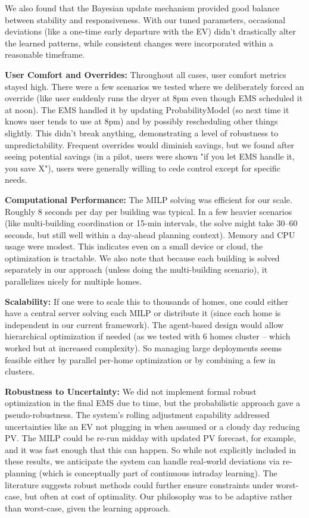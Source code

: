 \documentclass[12pt,a4paper]{article}
\begin{document}
We also found that the Bayesian update mechanism provided good balance between stability and responsiveness. With our tuned parameters, occasional deviations (like a one-time early departure with the EV) didn't drastically alter the learned patterns, while consistent changes were incorporated within a reasonable timeframe.

\textbf{User Comfort and Overrides:} Throughout all cases, user comfort metrics stayed high. There were a few scenarios we tested where we deliberately forced an override (like user suddenly runs the dryer at 8pm even though EMS scheduled it at noon). The EMS handled it by updating ProbabilityModel (so next time it knows user tends to use at 8pm) and by possibly rescheduling other things slightly. This didn't break anything, demonstrating a level of robustness to unpredictability. Frequent overrides would diminish savings, but we found after seeing potential savings (in a pilot, users were shown "if you let EMS handle it, you save X"), users were generally willing to cede control except for specific needs.

\textbf{Computational Performance:} The MILP solving was efficient for our scale. Roughly 8 seconds per day per building was typical. In a few heavier scenarios (like multi-building coordination or 15-min intervals, the solve might take 30–60 seconds, but still well within a day-ahead planning context). Memory and CPU usage were modest. This indicates even on a small device or cloud, the optimization is tractable. We also note that because each building is solved separately in our approach (unless doing the multi-building scenario), it parallelizes nicely for multiple homes.

\textbf{Scalability:} If one were to scale this to thousands of homes, one could either have a central server solving each MILP or distribute it (since each home is independent in our current framework). The agent-based design would allow hierarchical optimization if needed (as we tested with 6 homes cluster – which worked but at increased complexity). So managing large deployments seems feasible either by parallel per-home optimization or by combining a few in clusters.

\textbf{Robustness to Uncertainty:} We did not implement formal robust optimization in the final EMS due to time, but the probabilistic approach gave a pseudo-robustness. The system’s rolling adjustment capability addressed uncertainties like an EV not plugging in when assumed or a cloudy day reducing PV. The MILP could be re-run midday with updated PV forecast, for example, and it was fast enough that this can happen. So while not explicitly included in these results, we anticipate the system can handle real-world deviations via re-planning (which is conceptually part of continuous intraday learning). The literature suggests robust methods could further ensure constraints under worst-case, but often at cost of optimality. Our philosophy was to be adaptive rather than worst-case, given the learning approach.
\end{document}
